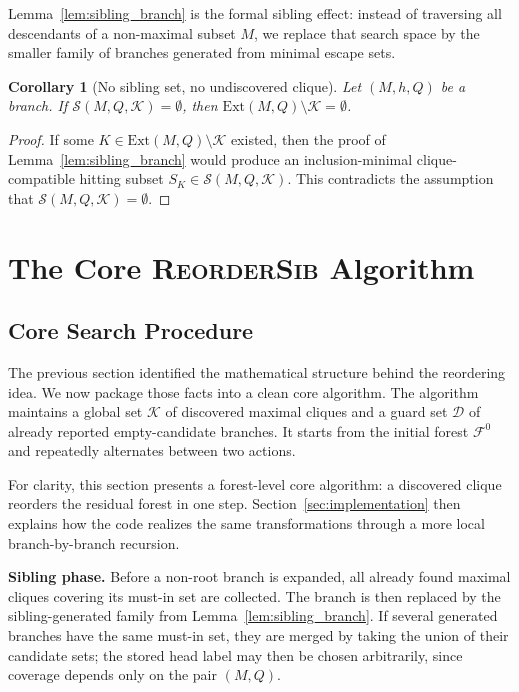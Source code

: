 \documentclass[sigconf, nonacm]{acmart}
\newtheorem{corollary}[theorem]{Corollary}
\theoremstyle{definition}
\theoremstyle{remark}
\begin{document}
Lemma~\ref{lem:sibling_branch} is the formal sibling effect: instead of
traversing all descendants of a non-maximal subset $M$, we replace that search
space by the smaller family of branches generated from minimal escape sets.

\begin{corollary}[No sibling set, no undiscovered clique]\label{cor:no-sibling}
Let $(M,h,Q)$ be a branch.  If
$\mathcal{S}(M,Q,\mathcal{K}) = \emptyset$, then
$\mathrm{Ext}(M,Q) \setminus \mathcal{K} = \emptyset$.
\end{corollary}

\begin{proof}
If some
$K \in \mathrm{Ext}(M,Q) \setminus \mathcal{K}$ existed, then the proof of
Lemma~\ref{lem:sibling_branch} would produce an inclusion-minimal
clique-compatible hitting subset
$S_K \in \mathcal{S}(M,Q,\mathcal{K})$.  This contradicts the assumption that
$\mathcal{S}(M,Q,\mathcal{K}) = \emptyset$.
\end{proof}

\section{The Core \textsc{ReorderSib} Algorithm}
\label{sec:algorithm}

\subsection{Core Search Procedure}

The previous section identified the mathematical structure behind the
reordering idea.  We now package those facts into a clean core algorithm.  The
algorithm maintains a global set $\mathcal{K}$ of discovered maximal cliques
and a guard set $\mathcal{D}$ of already reported empty-candidate branches.
It starts from the initial forest $\mathcal{F}^0$ and repeatedly alternates
between two actions.

For clarity, this section presents a forest-level core algorithm: a discovered
clique reorders the residual forest in one step.  Section~\ref{sec:implementation}
then explains how the code realizes the same transformations through a more
local branch-by-branch recursion.

\textbf{Sibling phase.}  Before a non-root branch is expanded, all already found
maximal cliques covering its must-in set are collected.  The branch is then
replaced by the sibling-generated family from
Lemma~\ref{lem:sibling_branch}.  If several generated branches have the same
must-in set, they are merged by taking the union of their candidate sets; the
stored head label may then be chosen arbitrarily, since coverage depends only on
the pair $(M,Q)$.
\end{document}
